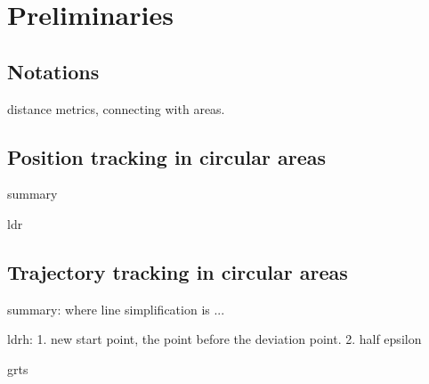 



\section{Preliminaries}
\label{sec-pre}

\subsection{Notations}
distance metrics, connecting with areas.

\subsection{Position tracking in circular areas}
summary

ldr

\subsection{Trajectory tracking in circular areas}
summary: 
where line simplification is ...

ldrh: 1. new start point, the point before the deviation point. 2. half epsilon

grts




